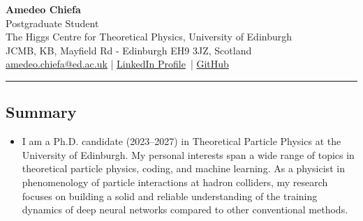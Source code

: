 \documentclass[10pt,a4paper]{article}
\begin{document}
\begin{center}
    {\LARGE \textbf{Amedeo Chiefa}} \\[0.1cm]
    {\large Postgraduate Student} \\
    \vspace{0.2cm}
    \small
    The Higgs Centre for Theoretical Physics, University of Edinburgh \\[0.1cm]
    JCMB, KB, Mayfield Rd - Edinburgh EH9 3JZ, Scotland \\
    \vspace{0.2cm}
    \href{mailto:amedeo.chiefa@ed.ac.uk}{amedeo.chiefa@ed.ac.uk} |
    \href{https://www.linkedin.com/in/amedeo-chiefa-b6a6bb231/}{LinkedIn Profile}\ |
    \href{https://github.com/achiefa}{GitHub}\
    \normalsize
\end{center}

\hrule
\vspace{-0.4em}
\subsection*{Summary}
\begin{itemize}[leftmargin=1em]
  \item[] I am a Ph.D. candidate (2023–2027) in Theoretical Particle Physics at
          the University of Edinburgh. My personal interests span a wide range
          of topics in theoretical particle physics, coding, and machine
          learning. As a physicist in phenomenology of particle interactions at
          hadron colliders, my research focuses on building a solid and reliable
          understanding of the training dynamics of deep neural networks
          compared to other conventional methods. 
\end{itemize}

\end{document}
